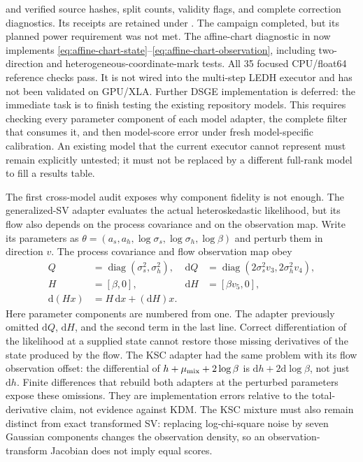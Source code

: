 \documentclass[11pt]{article}
\newcommand{\dd}{\mathrm{d}}
\begin{document}
and verified source hashes, split counts, validity flags, and complete
correction diagnostics.  Its receipts are retained under
.
The campaign completed, but its planned power requirement was not met.  The
affine-chart diagnostic in
now implements \eqref{eq:affine-chart-state}--\eqref{eq:affine-chart-observation},
including two-direction and heterogeneous-coordinate-mark tests.  All 35
focused CPU/float64 reference checks pass.  It is not wired into the
multi-step LEDH executor and has not been validated on GPU/XLA.  Further DSGE
implementation is deferred: the immediate task is to finish testing the
existing repository models.  This requires checking every parameter component
of each model adapter, the complete filter that consumes it, and then
model-score error under fresh model-specific calibration.  An existing model
that the current executor cannot represent must remain explicitly untested;
it must not be replaced by a different full-rank model to fill a results table.

The first cross-model audit exposes why component fidelity is not enough.
The generalized-SV adapter evaluates the actual heteroskedastic likelihood,
but its flow also depends on the process covariance and on the observation
map.  Write its parameters as
$\theta=(a_s,a_h,\log\sigma_s,\log\sigma_h,\log\beta)$ and perturb them in
direction $v$.  The process covariance and flow observation map obey
\begin{align}
 Q&=\operatorname{diag}(\sigma_s^2,\sigma_h^2),
 &\dd Q&=\operatorname{diag}(2\sigma_s^2v_3,2\sigma_h^2v_4),\\
 H&=[\beta,0], &\dd H&=[\beta v_5,0],\\
 \dd(Hx)&=H\,\dd x+(\dd H)x.
 \label{eq:repository-gsv-flow-tangent}
\end{align}
Here parameter components are numbered from one.  The adapter previously
omitted $\dd Q$, $\dd H$, and the second term in the last line.  Correct
differentiation of the likelihood at a supplied state cannot restore those
missing derivatives of the state produced by the flow.  The KSC adapter had
the same problem with its flow observation offset: the differential of
$h+\mu_{\rm mix}+2\log\beta$ is $\dd h+2\dd\log\beta$, not just $\dd h$.
Finite differences that rebuild both adapters at the perturbed parameters
expose these omissions.  They are implementation errors relative to the
total-derivative claim, not evidence against KDM.  The KSC mixture must also
remain distinct from exact transformed SV: replacing log-chi-square noise by
seven Gaussian components changes the observation density, so an
observation-transform Jacobian does not imply equal scores.
\end{document}
